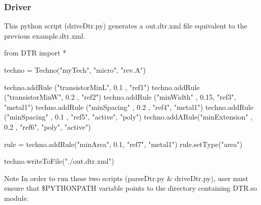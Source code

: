 \hypertarget{dtr_dtrDrivePython}{}\subsubsection{Driver}\label{dtr_dtrDrivePython}
This python script ({\ttfamily drive\+Dtr.\+py}) generates a out.\+dtr.\+xml file equivalent to the previous example.\+dtr.\+xml. 
\begin{DoxyCodeInclude}
\textcolor{keyword}{from} DTR \textcolor{keyword}{import} *

techno = Techno(\textcolor{stringliteral}{"myTech"}, \textcolor{stringliteral}{"micro"}, \textcolor{stringliteral}{"rev.A"})

techno.addRule (\textcolor{stringliteral}{"transistorMinL"}, 0.1 , \textcolor{stringliteral}{"ref1"})
techno.addRule (\textcolor{stringliteral}{"transistorMinW"}, 0.2 , \textcolor{stringliteral}{"ref2"})
techno.addRule (\textcolor{stringliteral}{"minWidth"}      , 0.15, \textcolor{stringliteral}{"ref3"}, \textcolor{stringliteral}{"metal1"})
techno.addRule (\textcolor{stringliteral}{"minSpacing"}    , 0.2 , \textcolor{stringliteral}{"ref4"}, \textcolor{stringliteral}{"metal1"})
techno.addRule (\textcolor{stringliteral}{"minSpacing"}    , 0.1 , \textcolor{stringliteral}{"ref5"}, \textcolor{stringliteral}{"active"}, \textcolor{stringliteral}{"poly"})
techno.addARule(\textcolor{stringliteral}{"minExtension"}  , 0.2 , \textcolor{stringliteral}{"ref6"}, \textcolor{stringliteral}{"poly"}, \textcolor{stringliteral}{"active"})

rule = techno.addRule(\textcolor{stringliteral}{"minArea"}, 0.1, \textcolor{stringliteral}{"ref7"}, \textcolor{stringliteral}{"metal1"})
rule.setType(\textcolor{stringliteral}{"area"})

techno.writeToFile(\textcolor{stringliteral}{"./out.dtr.xml"})
\end{DoxyCodeInclude}


\begin{DoxyNote}{Note}
In order to run these two scripts ({\ttfamily parse\+Dtr.\+py} \& drive\+Dtr.\+py), user must ensure that \$\+P\+Y\+T\+H\+O\+N\+P\+A\+TH variable points to the directory containing D\+T\+R.\+so module. 
\end{DoxyNote}
